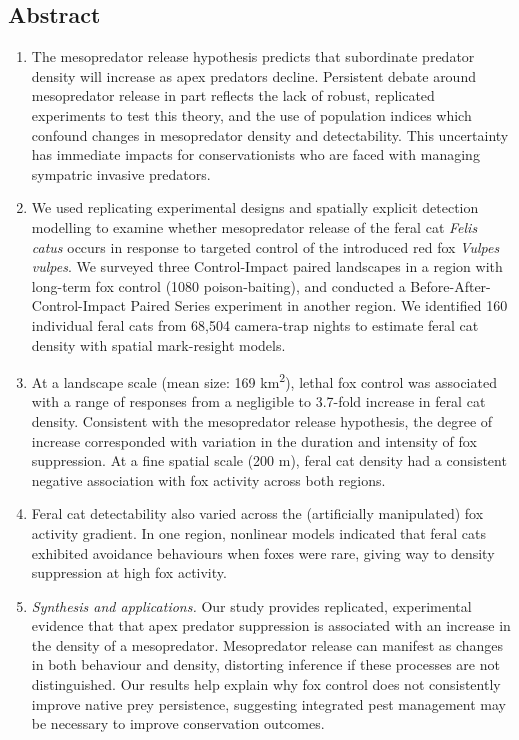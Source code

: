 \documentclass[11pt,a4paper,titlepage,twoside,openright]{style/unimelbthesis}
\begin{document}
\begin{mainmatter}
{\section*{Abstract}\label{abstract-2}}
\begin{enumerate}
\def\labelenumi{\arabic{enumi}.}
\item
  The mesopredator release hypothesis predicts that subordinate predator density will increase as apex predators decline. Persistent debate around mesopredator release in part reflects the lack of robust, replicated experiments to test this theory, and the use of population indices which confound changes in mesopredator density and detectability. This uncertainty has immediate impacts for conservationists who are faced with managing sympatric invasive predators.
\item
  We used replicating experimental designs and spatially explicit detection modelling to examine whether mesopredator release of the feral cat \emph{Felis catus} occurs in response to targeted control of the introduced red fox \emph{Vulpes vulpes}. We surveyed three Control-Impact paired landscapes in a region with long-term fox control (1080 poison-baiting), and conducted a Before-After-Control-Impact Paired Series experiment in another region. We identified 160 individual feral cats from 68,504 camera-trap nights to estimate feral cat density with spatial mark-resight models.
\item
  At a landscape scale (mean size: 169 km\textsuperscript{2}), lethal fox control was associated with a range of responses from a negligible to 3.7-fold increase in feral cat density. Consistent with the mesopredator release hypothesis, the degree of increase corresponded with variation in the duration and intensity of fox suppression. At a fine spatial scale (200 m), feral cat density had a consistent negative association with fox activity across both regions.
\item
  Feral cat detectability also varied across the (artificially manipulated) fox activity gradient. In one region, nonlinear models indicated that feral cats exhibited avoidance behaviours when foxes were rare, giving way to density suppression at high fox activity.
\item
  \emph{Synthesis and applications.} Our study provides replicated, experimental evidence that that apex predator suppression is associated with an increase in the density of a mesopredator. Mesopredator release can manifest as changes in both behaviour and density, distorting inference if these processes are not distinguished. Our results help explain why fox control does not consistently improve native prey persistence, suggesting integrated pest management may be necessary to improve conservation outcomes.
\end{enumerate}
\newpage


\end{mainmatter}
\end{document}
